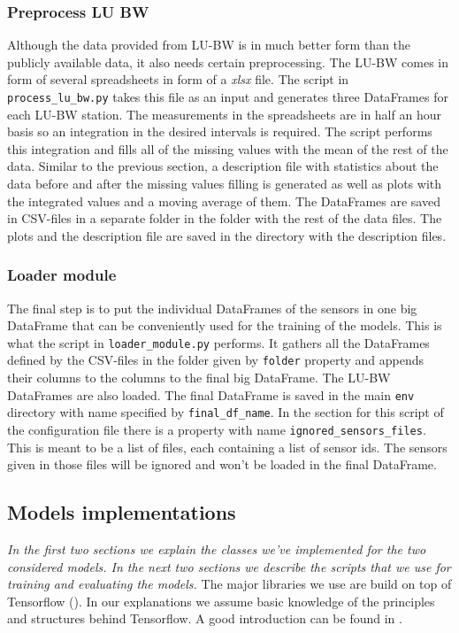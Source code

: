 \documentclass[12pt,a4paper,twoside]{scrartcl}
\numberwithin{equation}{section}
\begin{document}
\subsubsection{Preprocess LU BW}
\label{sec:preproc-lu-bw-module}
Although the data provided from LU-BW is in much better form than the publicly available data, it also needs certain preprocessing. The LU-BW comes in form of several spreadsheets in form of a  \emph{xlsx} file. The script in \texttt{process\_lu\_bw.py} takes this file as an input and generates three DataFrames for each LU-BW station. The measurements in the spreadsheets are in half an hour basis so an integration in the desired intervals is required. The script performs this integration and fills all of the missing values with the mean of the rest of the data. Similar to the previous section, a description file with statistics about the data before and after the missing values filling is generated as well as plots with the integrated values and a moving average of them. The DataFrames are saved in CSV-files in a separate folder in the folder with the rest of the data files. The plots and the description file are saved in the directory with the description files. 

\subsubsection{Loader module}
\label{sec:load-module}
The final step is to put the individual DataFrames of the sensors in one big DataFrame that can be conveniently used for the training of the models. This is what the script in \texttt{loader\_module.py} performs. It gathers all the DataFrames defined by the CSV-files in the folder given by \texttt{folder} property and appends their columns to the columns to the final big DataFrame. The LU-BW DataFrames are also loaded. The final DataFrame is saved in the main \texttt{env} directory with name specified by \texttt{final\_df\_name}. In the section for this script of the configuration file there is a property with name \texttt{ignored\_sensors\_files}. This is meant to be a list of files, each containing a list of sensor ids. The sensors given in those files will be ignored and won't be loaded in the final DataFrame.


\subsection{Models implementations}
\label{sec:impl-model}
\noindent\emph{In the first two sections we explain the classes we've implemented for the two considered models. In the next two sections we describe the scripts that we use for training and evaluating the models.}
The major libraries we use are build on top of Tensorflow (\cite{tf}). In our explanations we assume basic knowledge of the principles and structures behind Tensorflow. A good introduction can be found in \cite{tfnintro}.
\end{document}
